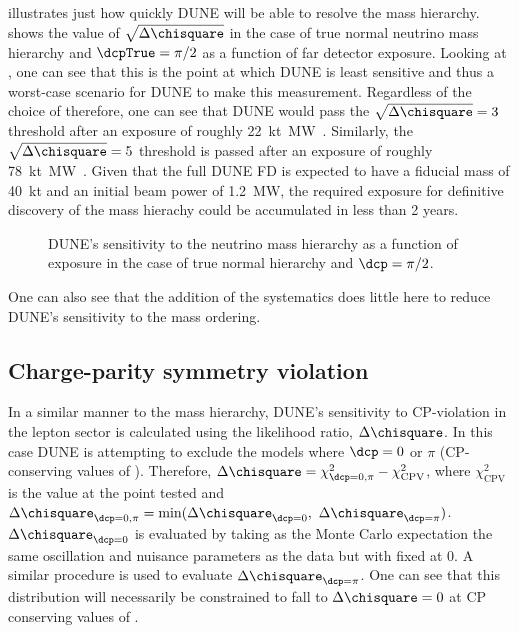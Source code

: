  illustrates just how quickly DUNE will be able to resolve the mass hierarchy.
 shows the value of $\sqrt{\Delta\chisquare}$ in the case of true normal neutrino mass hierarchy and $\dcpTrue = \pi/2$ as a function of far detector exposure. 
Looking at , one can see that this is the point at which DUNE is least sensitive and thus a worst-case scenario for DUNE to make this measurement.
Regardless of the choice of \dcp therefore, one can see that DUNE would pass the $\sqrt{\Delta\chisquare}=3$ threshold after an exposure of roughly \SI{22}{\kilo\tonne\mega\watt\year}.
Similarly, the $\sqrt{\Delta\chisquare}=5$ threshold is passed after an exposure of roughly \SI{78}{\kilo\tonne\mega\watt\year}.
Given that the full DUNE FD is expected to have a fiducial mass of \SI{40}{\kilo\tonne} and an initial beam power of \SI{1.2}{\mega\watt}, the required exposure for definitive discovery of the mass hierachy could be accumulated in less than 2 years.

\begin{figure}[h]
	\begin{adjustbox}{max totalsize=.6\linewidth, center}
		
	\end{adjustbox}
	\caption[DUNE's sensitivity to the neutrino mass hierarchy as a function of exposure]{DUNE's sensitivity to the neutrino mass hierarchy as a function of exposure in the case of true normal hierarchy and $\dcp=\pi/2$.}
	\label{fig:mhSensExp}
\end{figure}

One can also see that the addition of the systematics does little here to reduce DUNE's sensitivity to the mass ordering.

\subsection{Charge-parity symmetry violation}
\label{sec:dune_lbl:sensitivities:cpv}

In a similar manner to the mass hierarchy, DUNE's sensitivity to CP-violation in the lepton sector is calculated using the likelihood ratio, $\Delta \chisquare$.
In this case DUNE is attempting to exclude the models where $\dcp = 0$ or $\pi$ (CP-conserving values of \dcp).
Therefore, $\Delta \chisquare = \chi^{2}_{\dcp=0,\pi} - \chi^{2}_{\text{CPV}}$, where $\chi^{2}_{\text{CPV}}$ is the \chisquare value at the \dcp point tested and $\Delta \chisquare_{\dcp=0,\pi} = \min(\Delta \chisquare_{\dcp=0},~\Delta \chisquare_{\dcp=\pi})$.
$\Delta \chisquare_{\dcp=0}$ is evaluated by taking as the Monte Carlo expectation the same oscillation and nuisance parameters as the data but with \dcp fixed at 0.
A similar procedure is used to evaluate $\Delta \chisquare_{\dcp=\pi}$.
One can see that this distribution will necessarily be constrained to fall to $\Delta \chisquare = 0$ at CP conserving values of \dcp.

